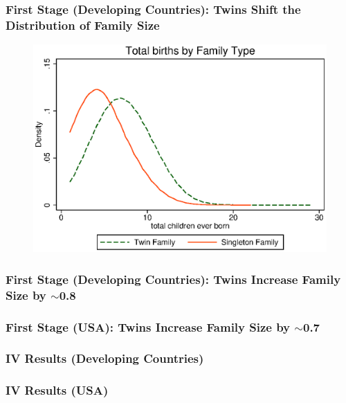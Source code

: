 \documentclass[9pt,letterpaper,subeqn]{beamer}
\begin{document}
\begin{frame}[label=FS1]
\frametitle{First Stage (Developing Countries): Twins Shift the Distribution of Family Size}
\begin{figure}[htpb!]
\centering
  \includegraphics[scale=0.75]{./figures/famsize.eps}
\end{figure}
\end{frame}


\begin{frame}[label=Fstage]
\frametitle{First Stage (Developing Countries): Twins Increase Family Size by $\sim$0.8}

\end{frame}

\begin{frame}[label=Fstage]
\frametitle{First Stage (USA): Twins Increase Family Size by $\sim$0.7}

\end{frame}



\begin{frame}[label=IV]
\frametitle{IV Results (Developing Countries)}

\hyperlink{DHSGender}{}
\end{frame}


\begin{frame}[label=USAIV]
\frametitle{IV Results (USA)}

\hyperlink{USAGender}{}
\end{frame}
\end{document}
